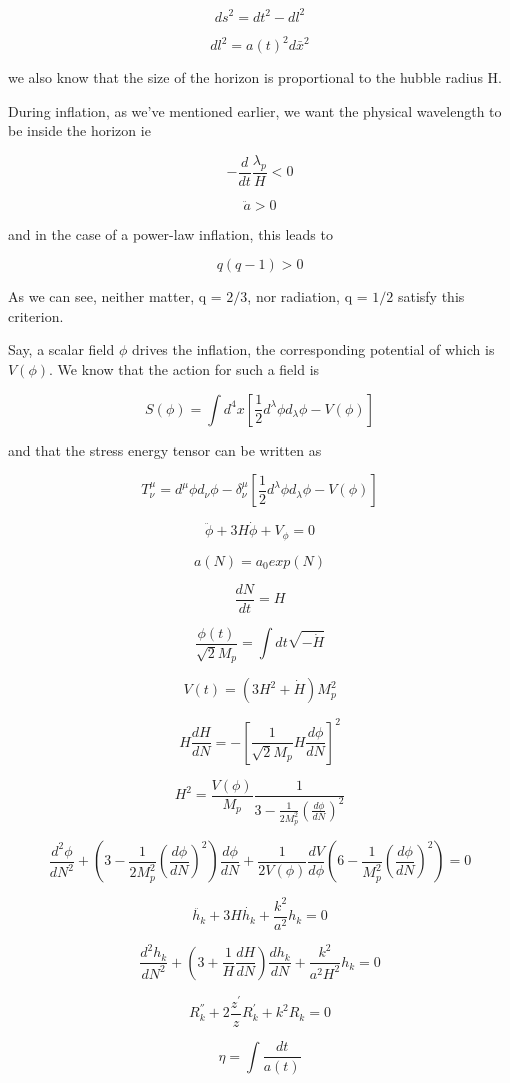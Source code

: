 \documentclass[12pt, a4paper]{report}
\begin{document}
$$ds^2 = dt^2 - dl^2$$

$$dl^2 = a(t)^2d\bar{x}^2$$

we also know that the size of the horizon is proportional to the hubble radius H.

During inflation, as we've mentioned earlier, we want the physical wavelength to be inside the horizon ie

$$-\frac{d}{dt}\frac{\lambda_p}{H} < 0$$

$$\ddot{a} > 0$$

and in the case of a power-law inflation, this leads to

$$q(q-1) > 0$$

As we can see, neither matter, q = $2/3$, nor radiation, q = $1/2$ satisfy this criterion.

Say, a scalar field $\phi$ drives the inflation, the corresponding potential of which is $V(\phi)$. We know that the action for such a field is 

$$S(\phi) = \int d^4x[\frac{1}{2}d^{\lambda}\phi d_{\lambda}\phi - V(\phi)]$$

and that the stress energy tensor can be written as 

$$T^{\mu}_{\nu} = d^{\mu}\phi d_{\nu}\phi -\delta^{\mu}_{\nu}[\frac{1}{2}d^{\lambda}\phi d_{\lambda}\phi - V(\phi)]$$

$$\ddot{\phi} + 3H\dot{\phi}+V_{\phi} = 0$$

$$a(N) = a_0exp(N)$$

$$\frac{dN}{dt} = H$$

$$\frac{\phi(t)}{\sqrt{2}M_p} = \int dt \sqrt{-\dot{H}}$$

$$V(t) = (3H^2 + \dot{H})M_p^2$$

$$H\frac{dH}{dN} = -[\frac{1}{\sqrt{2}M_p}H\frac{d\phi}{dN}]^2$$

$$H^2 = \frac{V(\phi)}{M_p}\frac{1}{3-\frac{1}{2M_p^2}(\frac{d\phi}{dN})^2}$$

$$\frac{d^2\phi}{dN^2} + (3-\frac{1}{2M_p^2}(\frac{d\phi}{dN})^2)\frac{d\phi}{dN} + \frac{1}{2V(\phi)}\frac{dV}{d\phi}(6-\frac{1}{M_p^2}(\frac{d\phi}{dN})^2) = 0$$

$$\ddot{h_k} + 3H\dot{h_k} +\frac{k^2}{a^2}h_k = 0$$

$$\frac{d^2h_k}{dN^2} + (3+\frac{1}{H}\frac{dH}{dN})\frac{dh_k}{dN} + \frac{k^2}{a^2H^2}h_k = 0$$

$$R_k^{''} + 2\frac{z^{'}}{z}R_k^{'} + k^2 R_k = 0$$

$$ \eta = \int \frac{dt}{a(t)}$$
\end{document}
